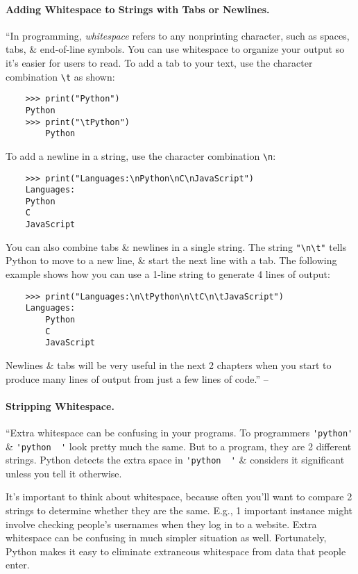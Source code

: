 \documentclass[oneside]{book}
\numberwithin{equation}{section}
\begin{document}
\paragraph{Adding Whitespace to Strings with Tabs or Newlines.} ``In programming, \textit{whitespace} refers to any nonprinting character, such as spaces, tabs, \& end-of-line symbols. You can use whitespace to organize your output so it's easier for users to read. To add a tab to your text, use the character combination \verb|\t| as shown:
\begin{verbatim}
	>>> print("Python")
	Python
	>>> print("\tPython")
	    Python
\end{verbatim}
To add a newline in a string, use the character combination \verb|\n|:
\begin{verbatim}
	>>> print("Languages:\nPython\nC\nJavaScript")
	Languages:
	Python
	C
	JavaScript
\end{verbatim}
You can also combine tabs \& newlines in a single string. The string \verb|"\n\t"| tells Python to move to a new line, \& start the next line with a tab. The following example shows how you can use a 1-line string to generate 4 lines of output:
\begin{verbatim}
	>>> print("Languages:\n\tPython\n\tC\n\tJavaScript")
	Languages:
	    Python
	    C
	    JavaScript
\end{verbatim}
Newlines \& tabs will be very useful in the next 2 chapters when you start to produce many lines of output from just a few lines of code.'' -- \cite[p. 22]{Matthes2019}

\paragraph{Stripping Whitespace.} ``Extra whitespace can be confusing in your programs. To programmers \verb|'python'| \& \verb|'python  '| look pretty much the same. But to a program, they are 2 different strings. Python detects the extra space in \verb|'python  '| \& considers it significant unless you tell it otherwise.

It's important to think about whitespace, because often you'll want to compare 2 strings to determine whether they are the same. E.g., 1 important instance might involve checking people's usernames when they log in to a website. Extra whitespace can be confusing in much simpler situation as well. Fortunately, Python makes it easy to eliminate extraneous whitespace from data that people enter.
\end{document}
